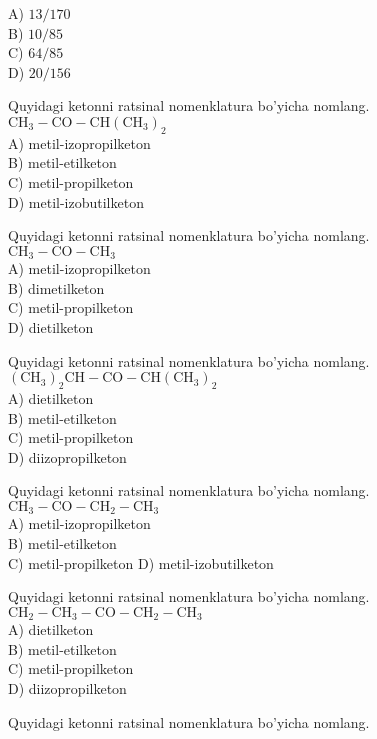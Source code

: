 A) $13 / 170$\\
B) $10 / 85$\\
C) $64 / 85$\\
D) $20 / 156$
  \item Quyidagi ketonni ratsinal nomenklatura bo'yicha nomlang.\\
$\mathrm{CH}_{3}-\mathrm{CO}-\mathrm{CH}\left(\mathrm{CH}_{3}\right)_{2}$\\
A) metil-izopropilketon\\
B) metil-etilketon\\
C) metil-propilketon\\
D) metil-izobutilketon\\
  \item Quyidagi ketonni ratsinal nomenklatura bo'yicha nomlang.\\
$\mathrm{CH}_{3}-\mathrm{CO}-\mathrm{CH}_{3}$\\
A) metil-izopropilketon\\
B) dimetilketon\\
C) metil-propilketon\\
D) dietilketon
  \item Quyidagi ketonni ratsinal nomenklatura bo'yicha nomlang.\\
$\left(\mathrm{CH}_{3}\right)_{2} \mathrm{CH}-\mathrm{CO}-\mathrm{CH}\left(\mathrm{CH}_{3}\right)_{2}$\\
A) dietilketon\\
B) metil-etilketon\\
C) metil-propilketon\\
D) diizopropilketon
  \item Quyidagi ketonni ratsinal nomenklatura bo'yicha nomlang.\\
$\mathrm{CH}_{3}-\mathrm{CO}-\mathrm{CH}_{2}-\mathrm{CH}_{3}$\\
A) metil-izopropilketon\\
B) metil-etilketon\\
C) metil-propilketon D) metil-izobutilketon
  \item Quyidagi ketonni ratsinal nomenklatura bo'yicha nomlang.\\
$\mathrm{CH}_{2}-\mathrm{CH}_{3}-\mathrm{CO}-\mathrm{CH}_{2}-\mathrm{CH}_{3}$\\
A) dietilketon\\
B) metil-etilketon\\
C) metil-propilketon\\
D) diizopropilketon
  \item Quyidagi ketonni ratsinal nomenklatura bo'yicha nomlang.\\
